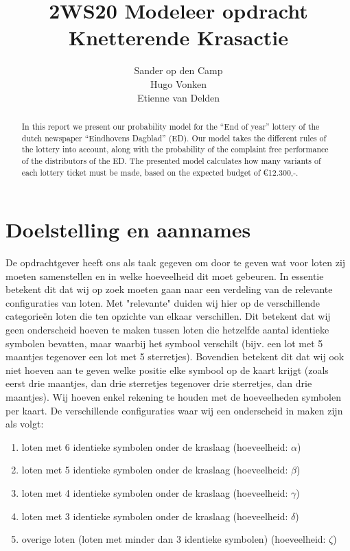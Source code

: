\documentclass[a4paper, oneside, book]{memoir}
\title{{\small 2WS20 Modeleer opdracht}\\ Knetterende Krasactie}
\author{
  Sander op den Camp \qquad {\tiny 0803350} \\
  Hugo Vonken \qquad {\tiny 0860541} \\
  Etienne van Delden \qquad {\tiny 0618959}
}
\begin{document}
\frontmatter
\maketitle
\thispagestyle{empty}

\begin{abstract}
  In this report we present our probability model for the ``End of year'' lottery of the dutch newspaper ``Eindhovens Dagblad'' (ED).
Our model takes the different rules of the lottery into account, along with the probability of the complaint free performance of the distributors of the ED.
The presented model calculates how many variants of each lottery ticket must be made, based on the expected budget of \euro12.300,-.
\end{abstract}
\newpage

\chapter*{Doelstelling en aannames}

De opdrachtgever heeft ons als taak gegeven om door te geven wat voor loten zij moeten samenstellen en in welke hoeveelheid dit moet gebeuren. In essentie betekent dit dat wij op zoek moeten gaan naar een verdeling van de relevante configuraties van loten. Met "relevante" duiden wij hier op de verschillende categorieën loten die ten opzichte van elkaar verschillen. Dit betekent dat wij geen onderscheid hoeven te maken tussen loten die hetzelfde aantal identieke symbolen bevatten, maar waarbij het symbool verschilt (bijv. een lot met 5 maantjes tegenover een lot met 5 sterretjes). Bovendien betekent dit dat wij ook niet hoeven aan te geven welke positie elke symbool op de kaart krijgt (zoals eerst drie maantjes, dan drie sterretjes tegenover drie sterretjes, dan drie maantjes). Wij hoeven enkel rekening te houden met de hoeveelheden symbolen per kaart. De verschillende configuraties waar wij een onderscheid in maken zijn als volgt:

\begin{enumerate}
    \item loten met 6 identieke symbolen onder de kraslaag (hoeveelheid: $\alpha$)
    \item loten met 5 identieke symbolen onder de kraslaag (hoeveelheid: $\beta$)
    \item loten met 4 identieke symbolen onder de kraslaag (hoeveelheid: $\gamma$)
    \item loten met 3 identieke symbolen onder de kraslaag (hoeveelheid: $\delta$)
    \item overige loten (loten met minder dan 3 identieke symbolen) (hoeveelheid: $\zeta$)
\end{enumerate}
\end{document}
